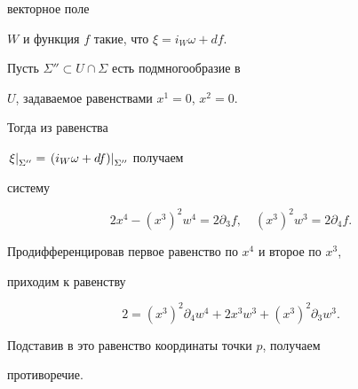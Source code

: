 векторное поле


$W$ и функция $f$ такие, что $\xi= i_W\omega+ df$.


Пусть $\Sigma'' \subset U \cap \Sigma$ есть подмногообразие в


$U$, задаваемое равенствами $x^1=0$, $x^2=0$.


Тогда из равенства


$\left. \xi \right|_{\Sigma''}= \left. (i_W\omega+df) \right|_{\Sigma''}$ получаем


систему


$$


2x^4 -(x^3)^2 w^4 = 2\partial_3 f,\quad (x^3)^2 w^3 = 2\partial_4 f.


$$


Продифференцировав первое равенство по $x^4$ и второе по $x^3$,


приходим к равенству


$$


2 =  (x^3)^2 \partial_4 w^4 + 2 x^3 w^3+  (x^3)^2\partial_3 w^3.


$$


Подставив в это равенство координаты точки $p$, получаем


противоречие.








